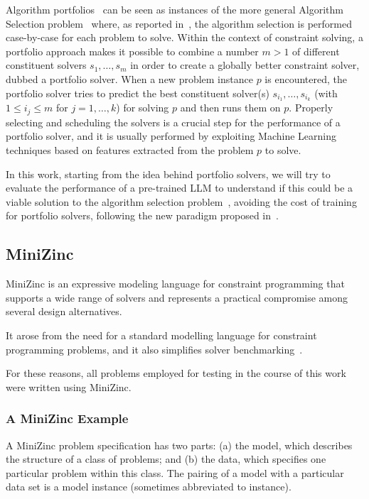 \documentclass[../../main]{subfiles}
\begin{document}
Algorithm portfolios~\cite{AlgPortfolio} can be seen as instances of the more general Algorithm Selection problem~\cite{AlgSelProb} where, as reported in~\cite{AlgSelCSP}, the algorithm selection is performed case-by-case for each problem to solve. Within the context of constraint solving, a portfolio approach makes it possible to combine a number $m > 1$ of different constituent solvers $s_1, \dots, s_m$ in order to create a globally better constraint solver, dubbed a portfolio solver. When a new problem instance $p$ is encountered, the portfolio solver tries to predict the best constituent solver(s) $s_{i_1}, \dots, s_{i_k}$ (with $1 \leq i_j \leq m$ for $j = 1, \dots, k$) for solving $p$ and then runs them on $p$. Properly selecting and scheduling the solvers is a crucial step for the performance of a portfolio solver, and it is usually performed by exploiting Machine Learning techniques based on features extracted from the problem $p$ to solve.

In this work, starting from the idea behind portfolio solvers, we will try to evaluate the performance of a pre-trained LLM to understand if this could be a viable solution to the algorithm selection problem~\cite{AlgSelProb}, avoiding the cost of training for portfolio solvers, following the new paradigm proposed in~\cite{fromPFStoAS}.

\subsection{MiniZinc}
MiniZinc is an expressive modeling language for constraint programming that supports a wide range of solvers and represents a practical compromise among several design alternatives.

It arose from the need for a standard modelling language for constraint programming problems, and it also simplifies solver benchmarking~\cite{MiniZinc}.

For these reasons, all problems employed for testing in the course of this work were written using MiniZinc.

\subsubsection{A MiniZinc Example}
A MiniZinc problem specification has two parts: (a) the model, which describes
the structure of a class of problems; and (b) the data, which specifies one particular problem within this class. The pairing of a model with a particular data set is a model instance (sometimes abbreviated to instance).
\end{document}

